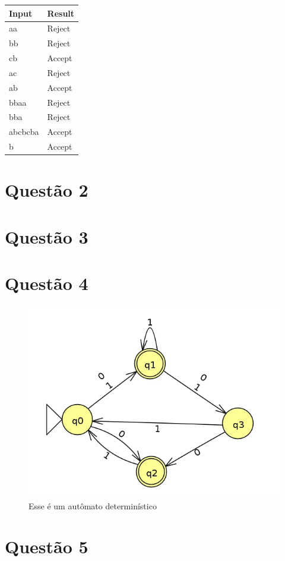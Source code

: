 \documentclass[11pt]{article}
\begin{document}
\begin{center}
\begin{tabular}{ll}
Input & Result\\
\hline
aa & Reject\\
bb & Reject\\
cb & Accept\\
ac & Reject\\
ab & Accept\\
bbaa & Reject\\
bba & Reject\\
abcbcba & Accept\\
b & Accept\\
\end{tabular}
\end{center}

\section{Questão 2}
\label{sec:org7a01ece}
\section{Questão 3}
\label{sec:orge7338ff}
\section{Questão 4}
\label{sec:org82b568b}
\begin{figure}[htbp]
\centering
\includegraphics[width=.9\linewidth]{./q4/q4.jpg}
\caption{\label{fig:org7b4e882}
Esse é um autômato determinístico}
\end{figure}
\section{Questão 5}
\label{sec:org7f86fe9}
\end{document}
